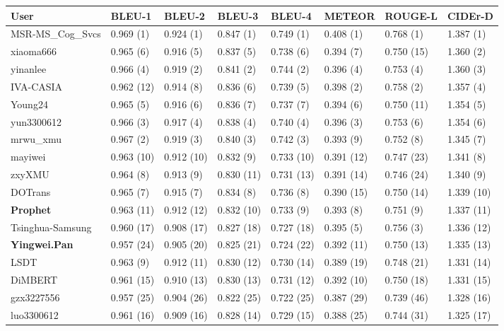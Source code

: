 \documentclass[english,twoside,openright]{HYgraduMLDS}
\begin{document}
\begin{appendices}
\scriptsize
\begin{longtable}{l|l|l|l|l|l|l|l} 
\centering 
User & BLEU-1 & BLEU-2 & BLEU-3 & BLEU-4 & METEOR & ROUGE-L & CIDEr-D \\
\hline \hline \endhead
MSR-MS\_Cog\_Svcs & 0.969 (1) & 0.924 (1) & 0.847 (1) & 0.749 (1) & 0.408 (1) & 0.768 (1) & 1.387 (1) \\
xiaoma666 & 0.965 (6) & 0.916 (5) & 0.837 (5) & 0.738 (6) & 0.394 (7) & 0.750 (15) & 1.360 (2) \\
yinanlee & 0.966 (4) & 0.919 (2) & 0.841 (2) & 0.744 (2) & 0.396 (4) & 0.753 (4) & 1.360 (3) \\
IVA-CASIA & 0.962 (12) & 0.914 (8) & 0.836 (6) & 0.739 (5) & 0.398 (2) & 0.758 (2) & 1.357 (4) \\
Young24 & 0.965 (5) & 0.916 (6) & 0.836 (7) & 0.737 (7) & 0.394 (6) & 0.750 (11) & 1.354 (5) \\
yun3300612 & 0.966 (3) & 0.917 (4) & 0.838 (4) & 0.740 (4) & 0.396 (3) & 0.753 (6) & 1.354 (6) \\
mrwu\_xmu & 0.967 (2) & 0.919 (3) & 0.840 (3) & 0.742 (3) & 0.393 (9) & 0.752 (8) & 1.345 (7) \\
mayiwei & 0.963 (10) & 0.912 (10) & 0.832 (9) & 0.733 (10) & 0.391 (12) & 0.747 (23) & 1.341 (8) \\
zxyXMU & 0.964 (8) & 0.913 (9) & 0.830 (11) & 0.731 (13) & 0.391 (14) & 0.746 (24) & 1.340 (9) \\
DOTrans & 0.965 (7) & 0.915 (7) & 0.834 (8) & 0.736 (8) & 0.390 (15) & 0.750 (14) & 1.339 (10) \\
\textbf{Prophet} & 0.963 (11) & 0.912 (12) & 0.832 (10) & 0.733 (9) & 0.393 (8) & 0.751 (9) & 1.337 (11) \\
Tsinghua-Samsung & 0.960 (17) & 0.908 (17) & 0.827 (18) & 0.727 (18) & 0.395 (5) & 0.756 (3) & 1.336 (12) \\
\textbf{Yingwei.Pan} & 0.957 (24) & 0.905 (20) & 0.825 (21) & 0.724 (22) & 0.392 (11) & 0.750 (13) & 1.335 (13) \\
LSDT & 0.963 (9) & 0.912 (11) & 0.830 (12) & 0.730 (14) & 0.389 (19) & 0.748 (21) & 1.331 (14) \\
DiMBERT & 0.961 (15) & 0.910 (13) & 0.830 (13) & 0.731 (12) & 0.392 (10) & 0.750 (18) & 1.331 (15) \\
gzx3227556 & 0.957 (25) & 0.904 (26) & 0.822 (25) & 0.722 (25) & 0.387 (29) & 0.739 (46) & 1.328 (16) \\
luo3300612 & 0.961 (16) & 0.909 (16) & 0.828 (14) & 0.729 (15) & 0.388 (25) & 0.744 (31) & 1.325 (17) \\

\end{longtable}
\end{appendices}
\end{document}
